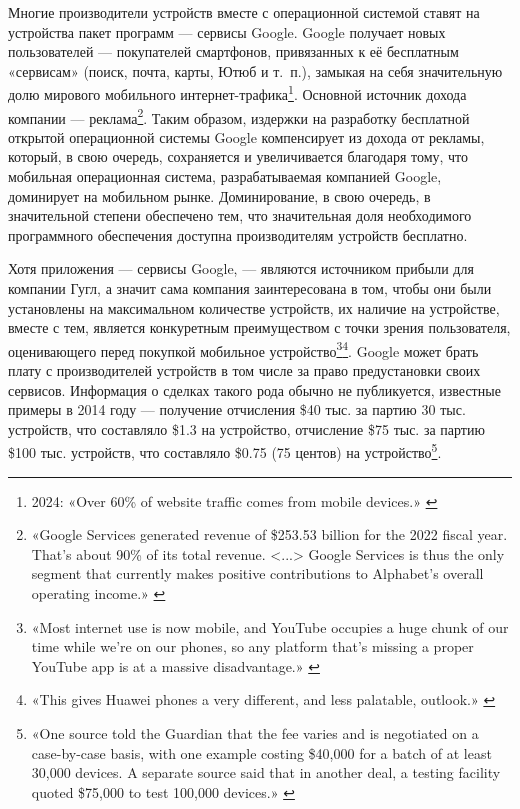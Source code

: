 \documentclass{article}
\begin{document}
Многие производители устройств вместе с операционной системой ставят на устройства пакет программ — сервисы Google. Google получает новых пользователей — покупателей смартфонов, привязанных к её бесплатным «сервисам» (поиск, почта, карты, Ютюб и т.~п.), замыкая на себя значительную долю мирового мобильного интернет-трафика\footnote{2024: «Over 60\% of website traffic comes from mobile devices.» \cite{mobileInternetTraffic2024}}. Основной источник дохода компании — реклама\footnote{«Google Services generated revenue of \$253.53 billion for the 2022 fiscal year. That's about 90\% of its total revenue. <...> Google Services is thus the only segment that currently makes positive contributions to Alphabet's overall operating income.» \cite{investopediaGoogleBusiness}}. Таким образом, издержки на разработку бесплатной открытой операционной системы Google компенсирует из дохода от рекламы, который, в свою очередь, сохраняется и увеличивается благодаря тому, что мобильная операционная система, разрабатываемая компанией Google, доминирует на мобильном рынке. Доминирование, в свою очередь, в значительной степени обеспечено тем, что значительная доля необходимого программного обеспечения доступна производителям устройств бесплатно.

Хотя приложения — сервисы Google, — являются источником прибыли для компании Гугл, а значит сама компания заинтересована в том, чтобы они были установлены на максимальном количестве устройств, их наличие на устройстве, вместе с тем, является конкуретным преимуществом с точки зрения пользователя, оценивающего перед покупкой мобильное устройство\footnote{«Most internet use is now mobile, and YouTube occupies a huge chunk of our time while we’re on our phones, so any platform that’s missing a proper YouTube app is at a massive disadvantage.» \cite{windowsPhoneFailure2017}}\footnote{«This gives Huawei phones a very different, and less palatable, outlook.» \cite{androidHuaweiBan2019}}. Google может брать плату с производителей устройств в том числе за право предустановки своих сервисов. Информация о сделках такого рода обычно не публикуется, известные примеры в 2014 году — получение отчисления \$40 тыс. за партию 30 тыс. устройств, что составляло \$1.3 на устройство, отчисление \$75 тыс. за партию \$100 тыс. устройств, что составляло \$0.75 (75 центов) на устройство\footnote{«One source told the Guardian that the fee varies and is negotiated on a case-by-case basis, with one example costing \$40,000 for a batch of at least 30,000 devices. A separate source said that in another deal, a testing facility quoted \$75,000 to test 100,000 devices.» \cite{androidCosts2014}}.
\end{document}
